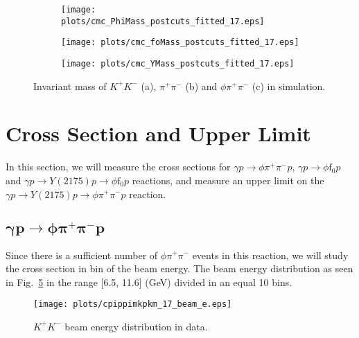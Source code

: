 \begin{figure}[H]
    \centering
    \begin{subfigure}[b]{0.45\textwidth}
        \texttt{[image: plots/cmc\_PhiMass\_postcuts\_fitted\_17.eps]}
        \caption{}
        \label{fig.4.3.1.a}
    \end{subfigure}
    \begin{subfigure}[b]{0.45\textwidth}
        \texttt{[image: plots/cmc\_foMass\_postcuts\_fitted\_17.eps]}
        \caption{}
        \label{fig.4.3.1.b}
    \end{subfigure}
    \begin{subfigure}[b]{0.45\textwidth}
        \texttt{[image: plots/cmc\_YMass\_postcuts\_fitted\_17.eps]}
        \caption{}
        \label{fig.4.3.1.c}
    \end{subfigure}
    \caption{Invariant mass of $K^+ K^-$ (a), $\pi^+ \pi^-$ (b) and $\phi \pi^+ \pi^-$ (c) in simulation.}
    \label{fig.4.3.1}
\end{figure}

\section{Cross Section and Upper Limit}
\label{p.4.5}

In this section, we will measure the cross sections for $\gamma p \rightarrow \phi \pi^+ \pi^- p$, $\gamma p \rightarrow \phi \mathrm{f}_0 p$ and $\gamma p \rightarrow Y(2175) p \rightarrow \phi \mathrm{f}_0 p$ reactions, and measure an upper limit on the $\gamma p \rightarrow Y(2175) p \rightarrow \phi \pi^+ \pi^- p$ reaction.

\subsection{\texorpdfstring{$\bm{\gamma p \rightarrow \phi \pi^{+} \pi^{-} p}$}{}}
\label{p.4.5.1}

Since there is a sufficient number of $\phi \pi^+ \pi^-$ events in this reaction, we will study the cross section in bin of the beam energy. The beam energy distribution as seen in Fig.~\ref{fig.4.5.1.1} in the range [6.5, 11.6] (GeV) divided in an equal 10 bins.

\begin{figure}[H]
    \centering
    \texttt{[image: plots/cpippimkpkm\_17\_beam\_e.eps]}
    \caption{\label{fig.4.5.1.1}$K^+ K^-$ beam energy distribution in data.}
\end{figure}

